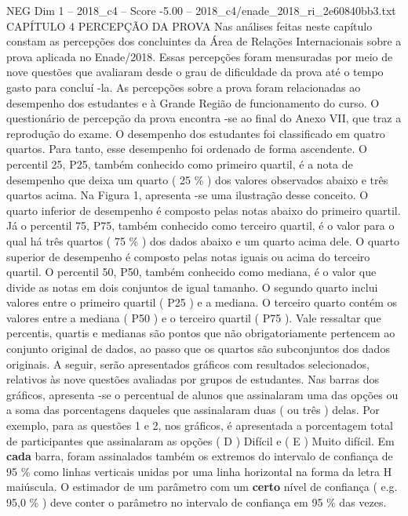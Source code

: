 \begin{textsample}{NEG Dim 1 – 2018\_c4 – Score -5.00 – 2018\_c4/enade\_2018\_ri\_2e60840bb3.txt}  \label{ex:f1_neg_131}
CAPÍTULO 4 PERCEPÇÃO DA PROVA Nas análises feitas neste capítulo constam as percepções dos concluintes da Área de Relações Internacionais sobre a prova aplicada no Enade/2018.
Essas percepções foram mensuradas por meio de nove questões que avaliaram desde o grau de dificuldade da prova até o tempo gasto para concluí -la.
As percepções sobre a prova foram relacionadas ao desempenho dos estudantes e à Grande Região de funcionamento do curso.
O questionário de percepção da prova encontra -se ao final do Anexo VII, que traz a reprodução do exame.
O desempenho dos estudantes foi classificado em quatro quartos.
Para tanto, esse desempenho foi ordenado de forma ascendente.
O percentil 25, P25, também conhecido como primeiro quartil, é a nota de desempenho que deixa um quarto ( 25 \% ) dos valores observados abaixo e três quartos acima.
Na Figura 1, apresenta -se uma ilustração desse conceito.
O quarto inferior de desempenho é composto pelas notas abaixo do primeiro quartil.
Já o percentil 75, P75, também conhecido como terceiro quartil, é o valor para o qual há três quartos ( 75 \% ) dos dados abaixo e um quarto acima dele.
O quarto superior de desempenho é composto pelas notas iguais ou acima do terceiro quartil.
O percentil 50, P50, também conhecido como mediana, é o valor que divide as notas em dois conjuntos de igual tamanho.
O segundo quarto inclui valores entre o primeiro quartil ( P25 ) e a mediana.
O terceiro quarto contém os valores entre a mediana ( P50 ) e o terceiro quartil ( P75 ).
Vale ressaltar que percentis, quartis e medianas são pontos que não obrigatoriamente pertencem ao conjunto original de dados, ao passo que os quartos são subconjuntos dos dados originais.
A seguir, serão apresentados gráficos com resultados selecionados, relativos às nove questões avaliadas por grupos de estudantes.
Nas barras dos gráficos, apresenta -se o percentual de alunos que assinalaram uma das opções ou a soma das porcentagens daqueles que assinalaram duas ( ou três ) delas.
Por exemplo, para as questões 1 e 2, nos gráficos, é apresentada a porcentagem total de participantes que assinalaram as opções ( D ) Difícil e ( E ) Muito difícil.
Em \textbf{cada} barra, foram assinalados também os extremos do intervalo de confiança de 95 \% como linhas verticais unidas por uma linha horizontal na forma da letra H maiúscula.
O estimador de um parâmetro com um \textbf{certo} nível de confiança ( e.g. 95,0 \% ) deve conter o parâmetro no intervalo de confiança em 95 \% das vezes.

\end{textsample}
